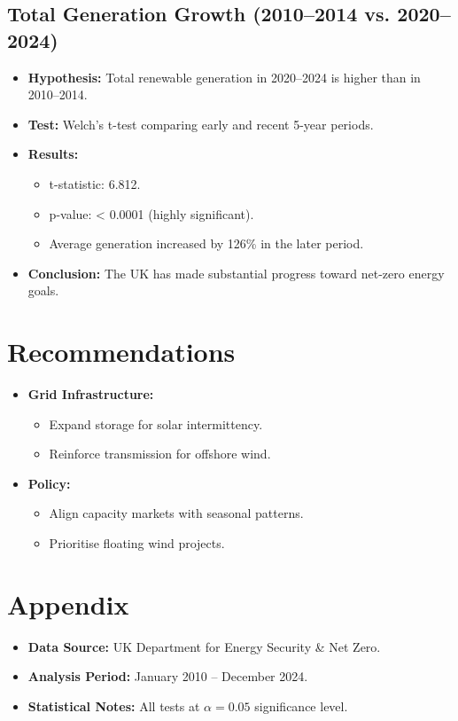 \documentclass[11pt]{article}
\begin{document}
\subsection{Total Generation Growth (2010--2014 vs. 2020--2024)}
\begin{itemize}
  \item \textbf{Hypothesis:} Total renewable generation in 2020--2024 is higher than in 2010--2014.
  \item \textbf{Test:} Welch's t-test comparing early and recent 5-year periods.
  \item \textbf{Results:}
    \begin{itemize}
      \item t-statistic: 6.812.
      \item p-value: < 0.0001 (highly significant).
      \item Average generation increased by 126\% in the later period.
    \end{itemize}
  \item \textbf{Conclusion:} The UK has made substantial progress toward net-zero energy goals.
\end{itemize}

\section{Recommendations}
\begin{itemize}
  \item \textbf{Grid Infrastructure:}
    \begin{itemize}
      \item Expand storage for solar intermittency.
      \item Reinforce transmission for offshore wind.
    \end{itemize}
  \item \textbf{Policy:}
    \begin{itemize}
      \item Align capacity markets with seasonal patterns.
      \item Prioritise floating wind projects.
    \end{itemize}
\end{itemize}

\section*{Appendix}
\begin{itemize}
  \item \textbf{Data Source:} UK Department for Energy Security \& Net Zero.
  \item \textbf{Analysis Period:} January 2010 -- December 2024.
  \item \textbf{Statistical Notes:} All tests at \(\alpha=0.05\) significance level.
\end{itemize}
\end{document}
